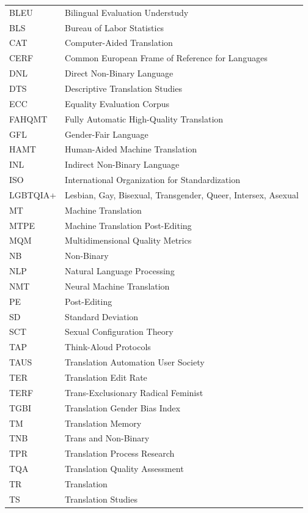 \addchap{\lsAbbreviationsTitle}

\begin{tabularx}{\textwidth}{lQ}
BLEU & Bilingual Evaluation Understudy \\
BLS & Bureau of Labor Statistics \\
CAT & Computer-Aided Translation \\
CERF & Common European Frame of Reference for Languages \\
DNL & Direct Non-Binary Language \\
DTS & Descriptive Translation Studies \\
ECC & Equality Evaluation Corpus \\
FAHQMT & Fully Automatic High-Quality Translation \\
GFL & Gender-Fair Language \\
HAMT & Human-Aided Machine Translation \\
INL & Indirect Non-Binary Language \\
ISO & International Organization for Standardization \\
LGBTQIA+ &  Lesbian, Gay, Bisexual, Transgender, Queer, Intersex, Asexual \\
MT & Machine Translation \\
MTPE & Machine Translation Post-Editing \\
MQM & Multidimensional Quality Metrics \\
NB & Non-Binary \\
NLP & Natural Language Processing \\
NMT & Neural Machine Translation \\
PE & Post-Editing \\
SD & Standard Deviation \\
SCT & Sexual Configuration Theory \\
TAP & Think-Aloud Protocols \\
TAUS & Translation Automation User Society \\
TER & Translation Edit Rate \\
TERF & Trans-Exclusionary Radical Feminist \\
TGBI & Translation Gender Bias Index \\
TM & Translation Memory \\
TNB & Trans and Non-Binary \\
TPR & Translation Process Research \\
TQA & Translation Quality Assessment \\
TR & Translation \\
TS & Translation Studies \\
\end{tabularx}








